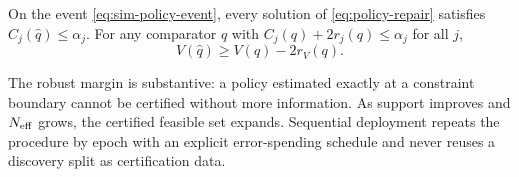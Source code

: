 \begin{proposition}
\label{prop:repair}
On the event \eqref{eq:sim-policy-event}, every solution of \cref{eq:policy-repair} satisfies $C_j(\widehat q)\le\alpha_j$. For any comparator $q$ with $C_j(q)+2r_j(q)\le\alpha_j$ for all $j$,
\begin{equation}
V(\widehat q)\ge V(q)-2r_V(q).
\label{eq:repair-utility}
\end{equation}
\end{proposition}
The robust margin is substantive: a policy estimated exactly at a constraint boundary cannot be certified without more information. As support improves and $N_{\mathrm{eff}}$ grows, the certified feasible set expands. Sequential deployment repeats the procedure by epoch with an explicit error-spending schedule and never reuses a discovery split as certification data.
